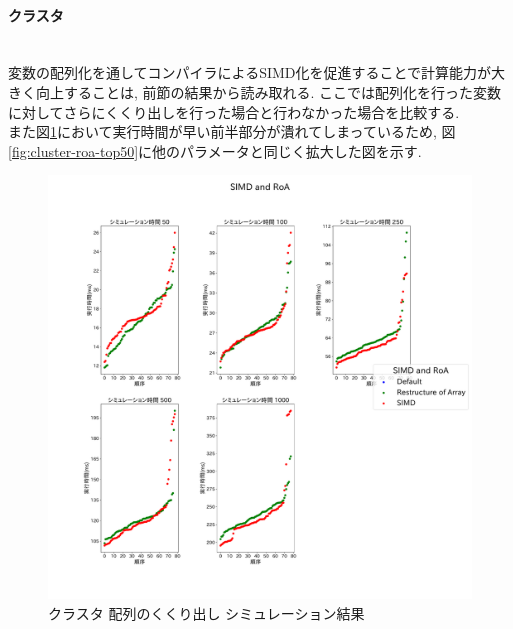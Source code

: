 \paragraph{クラスタ}~\\
変数の配列化を通してコンパイラによるSIMD化を促進することで計算能力が大きく向上することは,
前節の結果から読み取れる. ここでは配列化を行った変数に対してさらにくくり出しを行った場合と行わなかった場合を比較する.\\
また図\ref{fig:cluster-roa}において実行時間が早い前半部分が潰れてしまっているため,
図\ref{fig:cluster-roa-top50}に他のパラメータと同じく拡大した図を示す.\\
\begin{figure}[htb]
\begin{center}
    \includegraphics[width=14cm]{./images/cluster-SIMD-and-RoA.pdf}
    \caption{クラスタ 配列のくくり出し シミュレーション結果}
    \label{fig:cluster-roa}
\end{center}
\end{figure}

